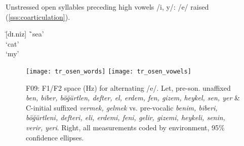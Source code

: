 \begin{example}\label{ex:trheightharmony}
Unstressed open syllables preceding high vowels /i, y/: /e/ raised (\cref{sss:coarticulation}).
  \begin{tabbing}
       \tab[2cm] \= [dɪ.niz] \tab[3cm] \=`sea' \\
       \> [kɪ.di] \>`cat' \\
       \> [bɪ.nim] \>`my'
  \end{tabbing}
\end{example}

\begin{figure}[ht]
  \centering
  \texttt{[image: tr\_osen\_words]}\hfill
    \texttt{[image: tr\_osen\_vowels]}
  \caption[pre-sonorant {\it heykel, sen, biber \ldots} vs. affixed pre-vocalic {\it heykel-i, sen-in, biber-i \ldots}]{F09: F1/F2 space (Hz) for alternating /e/. Let, pre-son. unaffixed {\it b\textcolor{todo}{e}n, bib\textcolor{todo}{e}r, böğürtl\textcolor{todo}{e}n, deft\textcolor{todo}{e}r, \textcolor{todo}{e}l, erd\textcolor{todo}{e}m, f\textcolor{todo}{e}n, giz\textcolor{todo}{e}m, heyk\textcolor{todo}{e}l, s\textcolor{todo}{e}n, y\textcolor{todo}{e}r} \& C-initial suffixed {\it v\textcolor{link}{e}rmek, g\textcolor{link}{e}lmek} vs. pre-vocalic {\it b\textcolor{link}{e}nim, bib\textcolor{link}{e}ri, böğürtl\textcolor{link}{e}ni, deft\textcolor{link}{e}ri, \textcolor{link}{e}li, erd\textcolor{link}{e}mi, f\textcolor{link}{e}ni, g\textcolor{link}{e}lir, giz\textcolor{link}{e}mi, heyk\textcolor{link}{e}li, s\textcolor{link}{e}nin, v\textcolor{link}{e}rir, y\textcolor{link}{e}ri}. Right, all measurements coded by environment, 95\% confidence ellipses.}
  \label{fig:trwords}
\end{figure}

